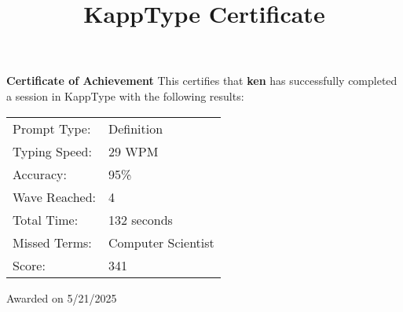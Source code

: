 \documentclass[a4paper,12pt]{article}
\title{KappType Certificate}
\author{}
\date{}
\begin{document}
\maketitle
\vspace{2cm}

\begin{center}
  \Large{\textbf{Certificate of Achievement}}
  \vspace{1cm}
  \normalsize{This certifies that}
  \vspace{0.5cm}
  \Large{\textbf{ken}}
  \vspace{0.5cm}
  \normalsize{has successfully completed a session in KappType with the following results:}
  \vspace{1cm}
  \begin{tabular}{ll}
    Prompt Type: & Definition \\
    Typing Speed: & 29 WPM \\
    Accuracy: & 95\% \\
    Wave Reached: & 4 \\
    Total Time: & 132 seconds \\
    Missed Terms: & \begin{minipage}[t]{0.6\textwidth} Computer Scientist \end{minipage} \\
    Score: & 341 \\
  \end{tabular}
  \vspace{2cm}
  \normalsize{Awarded on 5/21/2025}
\end{center}
\end{document}
